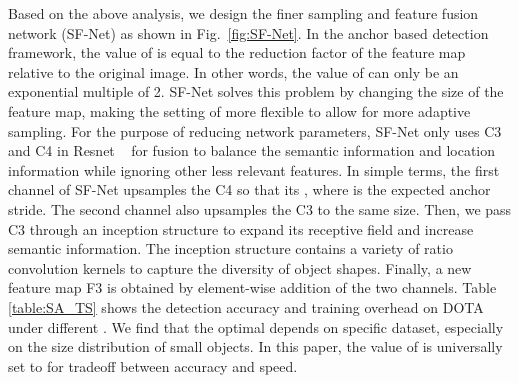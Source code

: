 \documentclass[10pt,twocolumn,letterpaper]{article}
\begin{document}
	Based on the above analysis, we design the finer sampling and feature fusion network (SF-Net) as shown in Fig.~\ref{fig:SF-Net}. In the anchor based detection framework, the value of  is equal to the reduction factor of the feature map relative to the original image. In other words, the value of  can only be an exponential multiple of 2. SF-Net solves this problem by changing the size of the feature map, making the setting of  more flexible to allow for more adaptive sampling. For the purpose of reducing network parameters, SF-Net only uses C3 and C4 in Resnet ~\cite{he2016deep} for fusion to balance the semantic information and location information while ignoring other less relevant features. In simple terms, the first channel of SF-Net upsamples the C4 so that its , where  is the expected anchor stride. The second channel also upsamples the C3 to the same size. Then, we pass C3 through an inception structure to expand its receptive field and increase semantic information. The inception structure contains a variety of ratio convolution kernels to capture the diversity of object shapes. Finally, a new feature map F3 is obtained by element-wise addition of the two channels. Table \ref{table:SA_TS} shows the detection accuracy and training overhead on DOTA under different . We find that the optimal  depends on specific dataset, especially on the size distribution of small objects. In this paper, the value of  is universally set to  for tradeoff between accuracy and speed.
	
\end{document}
